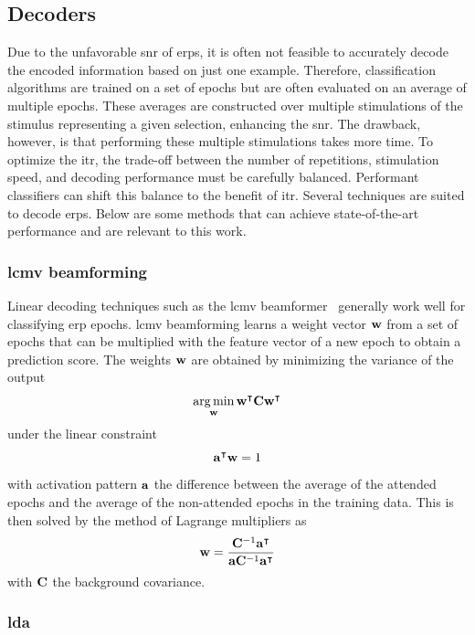 \subsection{Decoders}

Due to the unfavorable \ac{snr} of \acp{erp}, it is often not feasible to accurately
decode the encoded information based on just one example.
Therefore, classification algorithms are trained on a set of epochs but are often
evaluated on an average of multiple epochs.
These averages are constructed over multiple stimulations of the stimulus representing
a given selection, enhancing the \ac{snr}.
The drawback, however, is that performing these multiple stimulations takes more time.
To optimize the \ac{itr}, the trade-off between the number of repetitions, stimulation
speed, and decoding performance must be carefully balanced.
Performant classifiers can shift this balance to the benefit of \ac{itr}.
Several techniques are suited to decode \acp{erp}.
Below are some methods that can achieve state-of-the-art performance and are relevant to
this work.

\subsubsection{\Acf{lcmv} beamforming}

Linear decoding techniques such as the \ac{lcmv} beamformer~\cite{Wittevrongel2016}
generally work well for classifying \ac{erp} epochs.
\Ac{lcmv} beamforming learns a weight vector $\mathbf{w}$ from a set of epochs that can be
multiplied with the feature vector of a new epoch to obtain a prediction score.
The weights $\mathbf{w}$ are obtained by minimizing the variance of the output
\begin{equation}
  \operatorname*{arg\,min}_{\mathbf{w}}\mathbf{w}^\intercal\mathbf{C}
	\mathbf{w}^\intercal
\end{equation}
under the linear constraint
\begin{equation}
	\mathbf{a}^\intercal\mathbf{w} = 1
\end{equation}
with activation pattern $\mathbf{a}$ the difference between the average of the attended
epochs and the average of the non-attended epochs in the training data.
This is then solved by the method of Lagrange multipliers as
\begin{equation}
	\mathbf{w} =
  \frac{\mathbf{C}^{-1}\mathbf{a}^\intercal}
  {\mathbf{a}\mathbf{C}^{-1}\mathbf{a}^\intercal}
\end{equation}
with $\mathbf{C}$ the background covariance.

\subsubsection{\Acf{lda}}

